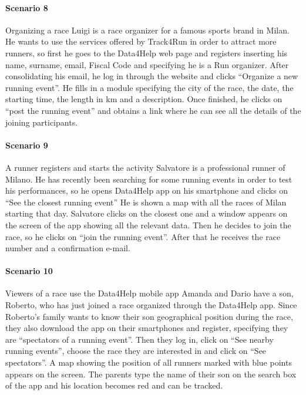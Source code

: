 \paragraph{Scenario 8} Organizing a race \newline
Luigi is a race organizer for a famous sports brand in Milan. He wants to use the services offered by Track4Run in order to attract more runners, so first he goes to the Data4Help web page and registers inserting his name, surname, email, Fiscal Code and specifying he is a Run organizer. After consolidating his email, he log in through the website and clicks “Organize a new running event”. He fills in a module specifying the city of the race, the date, the starting time, the length in km and a description. Once finished, he clicks on “post the running event” and obtains a link where he can see all the details of the joining participants.



\paragraph{Scenario 9} A runner registers and starts the activity \newline
Salvatore is a professional runner of Milano.  He has recently been searching for some running events in order to test his performances, so he opens Data4Help app on his smartphone and clicks on “See the closest running event”
He is shown a map with all the races of Milan starting that day. Salvatore clicks on the closest one and a window appears on the screen of the app showing all the relevant data. Then he decides to join the race, so he clicks on “join the running event”. After that he receives the race number and a confirmation e-mail.



\paragraph{Scenario 10} Viewers of a race use the Data4Help mobile app \newline
Amanda and Dario have a son, Roberto, who has just joined a race organized through the Data4Help app. Since Roberto’s family wants to know their son geographical position during the race, they also download the app on their smartphones and register, specifying they are “spectators of a running event”. Then they log in, click on “See nearby running events”, choose the race they are interested in and click on “See spectators”. A map showing the position of all runners marked with blue points appears on the screen. The parents type the name of their son on the search box of the app and  his location becomes red and can be tracked.
